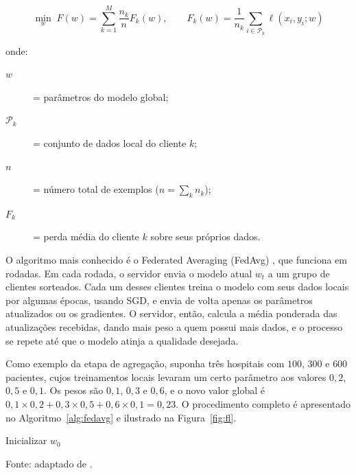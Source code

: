 \begin{equation} \label{eq:fl-objetivo}
\min_{w} \; F(w) = \sum_{k=1}^{M} \frac{n_k}{n} F_k(w), \qquad F_k(w) = \frac{1}{n_k} \sum_{i \in \mathcal{P}_k} \ell(x_i, y_i; w)
\end{equation}

\noindent onde:
\begin{description}
  \item[$w$] = parâmetros do modelo global;
  \item[$\mathcal{P}_k$] = conjunto de dados local do cliente $k$;
  \item[$n$] = número total de exemplos ($n = \sum_k n_k$);
  \item[$F_k$] = perda média do cliente $k$ sobre seus próprios dados.
\end{description}

O algoritmo mais conhecido é o Federated Averaging (FedAvg) \cite{McMahan2017}, que funciona em rodadas. Em cada rodada, o servidor envia o modelo atual $w_t$ a um grupo de clientes sorteados. Cada um desses clientes treina o modelo com seus dados locais por algumas épocas, usando SGD, e envia de volta apenas os parâmetros atualizados ou os gradientes. O servidor, então, calcula a média ponderada das atualizações recebidas, dando mais peso a quem possui mais dados, e o processo se repete até que o modelo atinja a qualidade desejada.

Como exemplo da etapa de agregação, suponha três hospitais com $100$, $300$ e $600$ pacientes, cujos treinamentos locais levaram um certo parâmetro aos valores $0{,}2$, $0{,}5$ e $0{,}1$. Os pesos são $0{,}1$, $0{,}3$ e $0{,}6$, e o novo valor global é $0{,}1 \times 0{,}2 + 0{,}3 \times 0{,}5 + 0{,}6 \times 0{,}1 = 0{,}23$. O procedimento completo é apresentado no Algoritmo~\ref{alg:fedavg} e ilustrado na Figura~\ref{fig:fl}.

\begin{algorithm2e}[H]
\caption{Federated Averaging (FedAvg)}
\label{alg:fedavg}
Inicializar $w_0$\;
\BlankLine
{}
\end{algorithm2e}
\vspace{-4mm}
\begin{center}\small Fonte: adaptado de .\end{center}

